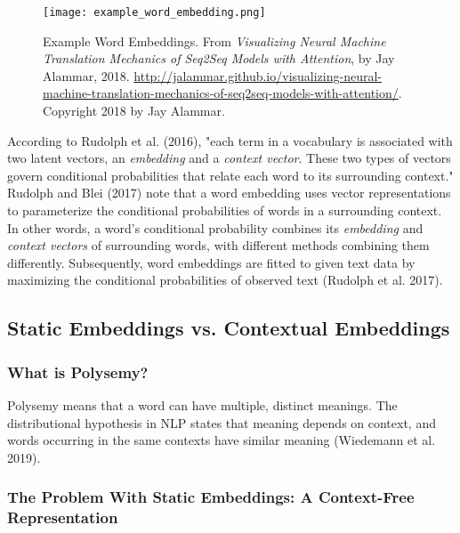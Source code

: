 \begin{figure}[h]
\centering
\texttt{[image: example\_word\_embedding.png]}
\caption{Example Word Embeddings. From \emph{Visualizing Neural Machine Translation Mechanics of Seq2Seq Models with Attention}, by Jay Alammar, 2018. \url{http://jalammar.github.io/visualizing-neural-machine-translation-mechanics-of-seq2seq-models-with-attention/}. Copyright 2018 by Jay Alammar.}
\end{figure}

According to Rudolph et al. (2016), "each term in a vocabulary is associated with two latent vectors, an \emph{embedding} and a \emph{context vector}. These two types of vectors govern conditional probabilities that relate each word to its surrounding context." 
Rudolph and Blei (2017) note that a word embedding uses vector representations to parameterize the conditional probabilities of words in a surrounding context. 
In other words, a word's conditional probability combines its \emph{embedding} and \emph{context vectors} of surrounding words, with different methods combining them differently. Subsequently, word embeddings are fitted to given text data by maximizing the conditional probabilities of observed text (Rudolph et al. 2017). 

\subsection{Static Embeddings vs. Contextual Embeddings}

\subsubsection{What is Polysemy?}

Polysemy means that a word can have multiple, distinct meanings. The distributional hypothesis in NLP states that meaning depends on context, and words occurring in the same contexts have similar meaning (Wiedemann et al. 2019). 

\subsubsection{The Problem With Static Embeddings: A Context-Free Representation}

